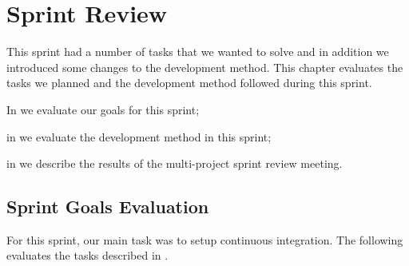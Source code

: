 \chapter{Sprint Review}\label{chap:sprint1_end}
This sprint had a number of tasks that we wanted to solve and in addition we introduced some changes to the development method. This chapter evaluates the tasks we planned and the development method followed during this sprint.

\begin{chapterorganization}
  \item In  we evaluate our goals for this sprint;
  \item in  we evaluate the development method in this sprint;
  \item in  we describe the results of the multi-project sprint review meeting.
\end{chapterorganization}

\section{Sprint Goals Evaluation}\label{sec:s1_goals}
For this sprint, our main task was to setup continuous integration. The following evaluates the tasks described in .

